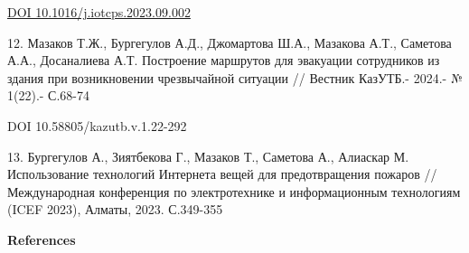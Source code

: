\begin{references}
\href{https://doi.org/10.1016/j.iotcps.2023.09.002}{DOI
10.1016/j.iotcps.2023.09.002}

12. Мазаков Т.Ж., Бургегулов А.Д., Джомартова Ш.А., Мазакова А.Т.,
Саметова А.А., Досаналиева А.Т. Построение маршрутов для эвакуации
сотрудников из здания при возникновении чрезвычайной ситуации // Вестник
КазУТБ.- 2024.- № 1(22).- С.68-74

DOI 10.58805/kazutb.v.1.22-292

13. Бургегулов А., Зиятбекова Г., Мазаков Т., Саметова А., Алиаскар М.
Использование технологий Интернета вещей для предотвращения пожаров //
Международная конференция по электротехнике и информационным технологиям
(ICEF 2023), Алматы, 2023. С.349-355
\end{references}

\begin{center}
{\bfseries References}
\end{center}

